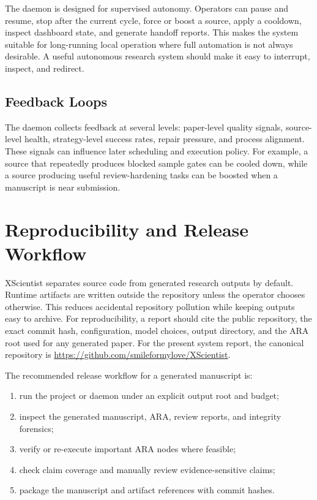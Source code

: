\documentclass[11pt]{article}
\begin{document}
The daemon is designed for supervised autonomy. Operators can pause and
resume, stop after the current cycle, force or boost a source, apply a
cooldown, inspect dashboard state, and generate handoff reports. This makes
the system suitable for long-running local operation where full automation is
not always desirable. A useful autonomous research system should make it easy
to interrupt, inspect, and redirect.

\subsection{Feedback Loops}

The daemon collects feedback at several levels: paper-level quality signals,
source-level health, strategy-level success rates, repair pressure, and
process alignment. These signals can influence later scheduling and execution
policy. For example, a source that repeatedly produces blocked sample gates
can be cooled down, while a source producing useful review-hardening tasks can
be boosted when a manuscript is near submission.

\section{Reproducibility and Release Workflow}

XScientist separates source code from generated research outputs by default.
Runtime artifacts are written outside the repository unless the operator
chooses otherwise. This reduces accidental repository pollution while keeping
outputs easy to archive. For reproducibility, a report should cite the
public repository, the exact commit hash, configuration, model choices, output
directory, and the ARA root used for any generated paper. For the present
system report, the canonical repository is
\url{https://github.com/smileformylove/XScientist}.

The recommended release workflow for a generated manuscript is:
\begin{enumerate}[leftmargin=*]
  \item run the project or daemon under an explicit output root and budget;
  \item inspect the generated manuscript, ARA, review reports, and integrity
  forensics;
  \item verify or re-execute important ARA nodes where feasible;
  \item check claim coverage and manually review evidence-sensitive claims;
  \item package the manuscript and artifact references with commit hashes.
\end{enumerate}
\end{document}

